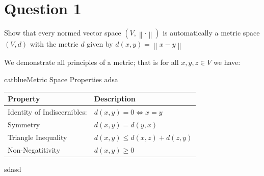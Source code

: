 
\author{Aren Vista}
\date{\today}

\maketitle
\section{Question 1}
Show that every normed vector space $\left(V, \left\| \cdot \right\| \right)$ is automatically a metric space $(V,d)$ with the metric $d$ given by $d(x,y) = \left\| x-y \right\|$

We demonstrate all principles of a metric; that is for all $x,y,z \in V$ we have:

\begin{cbox}{catblue}{Metric Space Properties}
	adsa
	\begin{table}[h]
		\centering
		\begin{tabular}{|l|l|}
			\hline
			Property                    & Description                  \\
			\hline
			Identity of Indiscernibles: & $d(x,y) = 0 \iff x=y$        \\
			\hline
			Symmetry                    & $d(x,y) = d(y,x)$            \\
			\hline
			Triangle Inequality         & $d(x,y) \le d(x,z) + d(z,y)$ \\
			\hline
			Non-Negatitivity            & $d(x,y) \ge 0$               \\
			\hline
		\end{tabular}
	\end{table}
	sdasd
\end{cbox}


